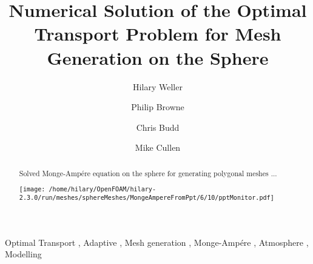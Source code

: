 \begin{frontmatter}

\title{Numerical Solution of the Optimal Transport Problem for Mesh Generation on the Sphere}

\author[label1]{Hilary Weller}
\author[label1]{Philip Browne}
\author[label2]{Chris Budd}
\author[label3]{Mike Cullen}
\address[label1]{Meteorology, University of Reading, UK}
\address[label2]{University of Bath, UK}
\address[label3]{Met Office, UK}

\begin{abstract}

Solved Monge-Amp\'ere equation on the sphere for generating polygonal meshes ... 


\texttt{[image: /home/hilary/OpenFOAM/hilary-2.3.0/run/meshes/sphereMeshes/MongeAmpereFromPpt/6/10/pptMonitor.pdf]}

\end{abstract}

\begin{keyword}
Optimal Transport \sep
Adaptive \sep
Mesh generation \sep
Monge-Amp\'ere \sep
Atmosphere \sep
Modelling
\end{keyword}

\end{frontmatter}

